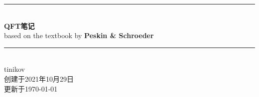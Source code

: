 \documentclass[10pt,b5paper, openany]{book} %
\newcommand{\HRule}{\rule{\linewidth}{0.5mm}}
\begin{document}
\pagestyle{fancy}

\begin{titlepage}
  \centering

  \HRule \\[0.7cm]

  {\bfseries \fontsize{35pt}{1pt}\selectfont {}QFT笔记} \\[0.3cm]

  {\fontsize{14pt}{1pt}\selectfont based on the textbook by {\bfseries Peskin \& Schroeder}} \\[0.4cm]

  \HRule \\[0.6cm]

  {\Large tinikov} \\[0.2cm]

  {\small 创建于2021年10月29日} \\[-0.1cm]

  {\small 更新于\today} \\[0cm]

\end{titlepage}

\setcounter{page}{1}

\clearpage

{}
{
  \hypersetup{linkcolor=black}
  \tableofcontents
}
\clearpage
\end{document}
